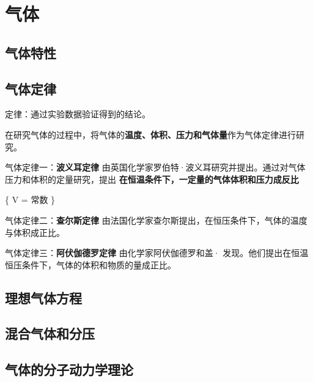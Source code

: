 \section{气体}

\subsection{气体特性}



\subsection{气体定律}
定律：通过实验数据验证得到的结论。

在研究气体的过程中，将气体的\textbf{温度、体积、压力和气体量}作为气体定律进行研究。

气体定律一：\textbf{波义耳定律} 由英国化学家罗伯特·波义耳研究并提出。通过对气体压力和体积的定量研究，提出 \textbf{在恒温条件下，一定量的气体体积和压力成反比}

\{ V = 常数 \}

气体定律二：\textbf{查尔斯定律} 由法国化学家查尔斯提出，在恒压条件下，气体的温度与体积成正比。

气体定律三：\textbf{阿伏伽德罗定律} 由化学家阿伏伽德罗和盖· 发现。他们提出在恒温恒压条件下，气体的体积和物质的量成正比。

\subsection{理想气体方程}

\subsection{混合气体和分压}

\subsection{气体的分子动力学理论}

